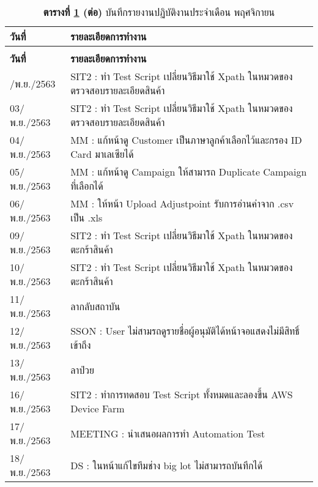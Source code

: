 \begin{longtable}{|l|l|}
	\caption{บันทึกรายงานการปฎิบัติงาน พฤศจิกายน}\label{timeSheetDetailJulyJuneAugSepOctNov} \\
	\hline
	\textbf{วันที่} & \textbf{รายละเอียดการทำงาน}            \\                                         
	\hline
	\endfirsthead
	\caption* {\textbf{ตารางที่ \ref{timeSheetDetailJulyJuneAugSepOctNov} (ต่อ)} บันทึกรายงานปฏิบัติงานประจำเดือน พฤศจิกายน} \\
	\hline
	\textbf{วันที่} & \textbf{รายละเอียดการทำงาน}            \\                                         
	\hline
	\endhead
	\hline
	\endfoot
	\hline
	02/พ.ย./2563    & SIT2 : ทำ Test Script เปลี่ยนวิธีมาใช้ Xpath ในหมวดของ ตรวจสอบรายละเอียดสินค้า  \\ 
	\hline
	03/พ.ย./2563    & SIT2 : ทำ Test Script เปลี่ยนวิธีมาใช้ Xpath ในหมวดของ ตรวจสอบรายละเอียดสินค้า  \\ 
	\hline
	04/พ.ย./2563    & MM : แก้หน้าดู Customer เป็นภาษาลูกค้าเลือกไว้และกรอง ID Card มาเลเซียได้       \\ 
	\hline
	05/พ.ย./2563    & MM : แก้หน้าดู Campaign ให้สามารถ Duplicate Campaign ที่เลือกได้                \\ 
	\hline
	06/พ.ย./2563    & MM : ให้หน้า Upload Adjustpoint รับการอ่านค่าจาก .csv เป็น .xls~                \\ 
	\hline
	09/พ.ย./2563    & SIT2 : ทำ Test Script เปลี่ยนวิธีมาใช้ Xpath ในหมวดของ ตะกร้าสินค้า             \\ 
	\hline
	10/พ.ย./2563    & SIT2 : ทำ Test Script เปลี่ยนวิธีมาใช้ Xpath ในหมวดของ ตะกร้าสินค้า             \\ 
	\hline
	11/พ.ย./2563    & ลากลับสถาบัน                                                                    \\ 
	\hline
	12/พ.ย./2563    & SSON : User ไม่สามรถดูรายชื่อผู้อนุมัติได้หน้าจอแสดงไม่มีสิทธิ์เข้าถึง          \\ 
	\hline
	13/พ.ย./2563    & ลาป่วย                                                                          \\ 
	\hline
	16/พ.ย./2563    & SIT2 : ทำการทดสอบ Test Script ทั้งหมดและลองขึ้น AWS Device Farm                 \\ 
	\hline
	17/พ.ย./2563    & MEETING : นำเสนอผลการทำ Automation Test                                         \\ 
	\hline
	18/พ.ย./2563    & DS : ในหน้าแก้ไขทีมช่าง big lot ไม่สามารถบันทึกได้                              \\ 

\end{longtable}
